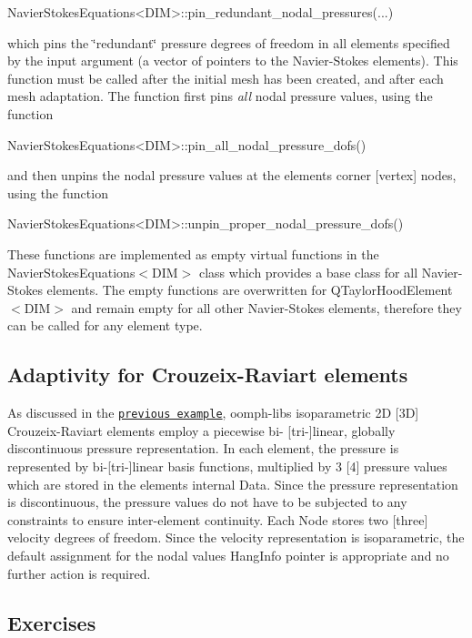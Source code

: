 \begin{DoxyCode}
NavierStokesEquations<DIM>::pin\_redundant\_nodal\_pressures(...)
\end{DoxyCode}


which pins the \char`\"{}redundant\char`\"{} pressure degrees of freedom in all elements specified by the input argument (a vector of pointers to the Navier-\/\+Stokes elements). This function must be called after the initial mesh has been created, and after each mesh adaptation. The function first pins {\itshape all} nodal pressure values, using the function


\begin{DoxyCode}
NavierStokesEquations<DIM>::pin\_all\_nodal\_pressure\_dofs()
\end{DoxyCode}


and then unpins the nodal pressure values at the elements\textquotesingle{} corner \mbox{[}vertex\mbox{]} nodes, using the function


\begin{DoxyCode}
NavierStokesEquations<DIM>::unpin\_proper\_nodal\_pressure\_dofs()
\end{DoxyCode}


These functions are implemented as empty virtual functions in the {\ttfamily Navier\+Stokes\+Equations$<$\+D\+I\+M$>$} class which provides a base class for all Navier-\/\+Stokes elements. The empty functions are overwritten for {\ttfamily Q\+Taylor\+Hood\+Element$<$\+D\+I\+M$>$} and remain empty for all other Navier-\/\+Stokes elements, therefore they can be called for any element type.\hypertarget{index_refining_CR}{}\subsection{Adaptivity for Crouzeix-\/\+Raviart elements}\label{index_refining_CR}
As discussed in the \href{../../driven_cavity/html/index.html#CR}{\tt previous example}, {\ttfamily oomph-\/lib\textquotesingle{}s} isoparametric 2D \mbox{[}3D\mbox{]} Crouzeix-\/\+Raviart elements employ a piecewise bi-\/ \mbox{[}tri-\/\mbox{]}linear, globally discontinuous pressure representation. In each element, the pressure is represented by bi-\/\mbox{[}tri-\/\mbox{]}linear basis functions, multiplied by 3 \mbox{[}4\mbox{]} pressure values which are stored in the element\textquotesingle{}s internal {\ttfamily Data}. Since the pressure representation is discontinuous, the pressure values do not have to be subjected to any constraints to ensure inter-\/element continuity. Each {\ttfamily Node} stores two \mbox{[}three\mbox{]} velocity degrees of freedom. Since the velocity representation is isoparametric, the default assignment for the nodal values\textquotesingle{} {\ttfamily Hang\+Info} pointer is appropriate and no further action is required.\hypertarget{index_exercises}{}\subsection{Exercises}\label{index_exercises}

